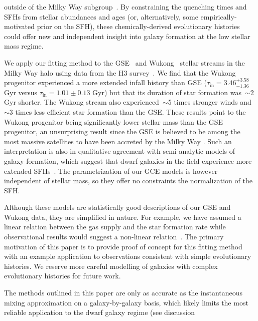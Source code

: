 \documentclass[ms.tex]{subfiles}
\begin{document}
outside of the Milky Way subgroup~\citep{Monelli2010a, Monelli2010b,
Weisz2014a}.
By constraining the quenching times and SFHs from stellar abundances and ages
(or, alternatively, some empirically-motivated prior on the SFH), these
chemically-derived evolutionary histories could offer new and independent
insight into galaxy formation at the low stellar mass regime.
\par
We apply our fitting method to the GSE~\citep{Belokurov2018, Helmi2018} and
Wukong~\citep{Naidu2020, Naidu2022} stellar streams in the Milky Way halo using
data from the H3 survey~\citep{Conroy2019}.
We find that the Wukong progenitor experienced a more extended infall history
than GSE ($\tau_\text{in} = 3.46^{+3.58}_{-1.36}$ Gyr versus
$\tau_\text{in} = 1.01 \pm 0.13$ Gyr) but that its duration of star formation
was~$\sim$2 Gyr shorter.
The Wukong stream also experienced~$\sim$5 times stronger winds and~$\sim$3
times less efficient star formation than the GSE.
These results point to the Wukong progenitor being significantly lower stellar
mass than the GSE progenitor, an unsurprising result since the GSE is believed
to be among the most massive satellites to have been accreted by the Milky Way
\citep{Myeong2018, Deason2019, Fattahi2019, Mackereth2019, Vincenzo2019}.
Such an interpretation is also in qualitative agreement with semi-analytic
models of galaxy formation, which suggest that dwarf galaxies in the field
experience more extended SFHs~\citep{Baugh2006, Somerville2015a, Behroozi2019}.
The parametrization of our GCE models is however independent of stellar mass,
so they offer no constraints the normalization of the SFH.
\par
Although these models are statistically good descriptions of our GSE and Wukong
data, they are simplified in nature.
For example, we have assumed a linear relation between the gas supply and the
star formation rate while observational results would suggest a non-linear
relation~\citep[e.g.][]{Kennicutt1998, Kennicutt2012, delosReyes2019,
Kennicutt2021}.
The primary motivation of this paper is to provide proof of concept for this
fitting method with an example application to observations consistent with
simple evolutionary histories.
We reserve more careful modelling of galaxies with complex evolutionary
histories for future work.
\par
The methods outlined in this paper are only as accurate as the instantaneous
mixing approximation on a galaxy-by-galaxy basis, which likely limits the
most reliable application to the dwarf galaxy regime (see discussion
\end{document}
